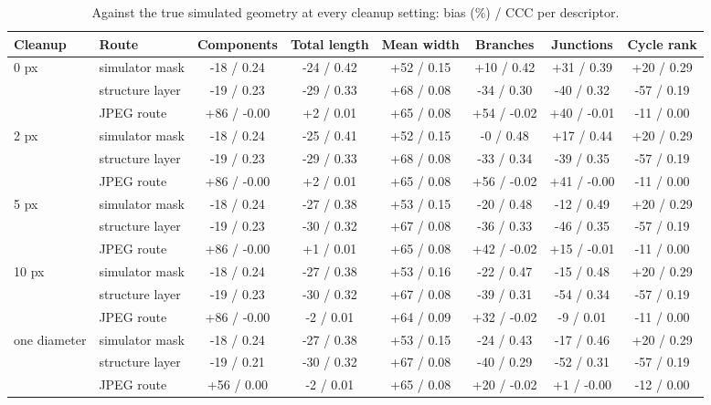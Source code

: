 \begin{table}[h]
\centering
\caption{Against the true simulated geometry at every cleanup setting: bias (\%) / CCC per descriptor.}
\label{tab:supp-truth-L}
\footnotesize
\begin{adjustbox}{max width=\linewidth}
\begin{tabular}{llcccccc}
\toprule
Cleanup & Route & Components & Total length & Mean width & Branches & Junctions & Cycle rank\\
\midrule
0 px & simulator mask & -18 / 0.24 & -24 / 0.42 & +52 / 0.15 & +10 / 0.42 & +31 / 0.39 & +20 / 0.29\\
 & structure layer & -19 / 0.23 & -29 / 0.33 & +68 / 0.08 & -34 / 0.30 & -40 / 0.32 & -57 / 0.19\\
 & JPEG route & +86 / -0.00 & +2 / 0.01 & +65 / 0.08 & +54 / -0.02 & +40 / -0.01 & -11 / 0.00\\
\midrule
2 px & simulator mask & -18 / 0.24 & -25 / 0.41 & +52 / 0.15 & -0 / 0.48 & +17 / 0.44 & +20 / 0.29\\
 & structure layer & -19 / 0.23 & -29 / 0.33 & +68 / 0.08 & -33 / 0.34 & -39 / 0.35 & -57 / 0.19\\
 & JPEG route & +86 / -0.00 & +2 / 0.01 & +65 / 0.08 & +56 / -0.02 & +41 / -0.00 & -11 / 0.00\\
\midrule
5 px & simulator mask & -18 / 0.24 & -27 / 0.38 & +53 / 0.15 & -20 / 0.48 & -12 / 0.49 & +20 / 0.29\\
 & structure layer & -19 / 0.23 & -30 / 0.32 & +67 / 0.08 & -36 / 0.33 & -46 / 0.35 & -57 / 0.19\\
 & JPEG route & +86 / -0.00 & +1 / 0.01 & +65 / 0.08 & +42 / -0.02 & +15 / -0.01 & -11 / 0.00\\
\midrule
10 px & simulator mask & -18 / 0.24 & -27 / 0.38 & +53 / 0.16 & -22 / 0.47 & -15 / 0.48 & +20 / 0.29\\
 & structure layer & -19 / 0.23 & -30 / 0.32 & +67 / 0.08 & -39 / 0.31 & -54 / 0.34 & -57 / 0.19\\
 & JPEG route & +86 / -0.00 & -2 / 0.01 & +64 / 0.09 & +32 / -0.02 & -9 / 0.01 & -11 / 0.00\\
\midrule
one diameter & simulator mask & -18 / 0.24 & -27 / 0.38 & +53 / 0.15 & -24 / 0.43 & -17 / 0.46 & +20 / 0.29\\
 & structure layer & -19 / 0.21 & -30 / 0.32 & +67 / 0.08 & -40 / 0.29 & -52 / 0.31 & -57 / 0.19\\
 & JPEG route & +56 / 0.00 & -2 / 0.01 & +65 / 0.08 & +20 / -0.02 & +1 / -0.00 & -12 / 0.00\\
\bottomrule
\end{tabular}
\end{adjustbox}
\end{table}
